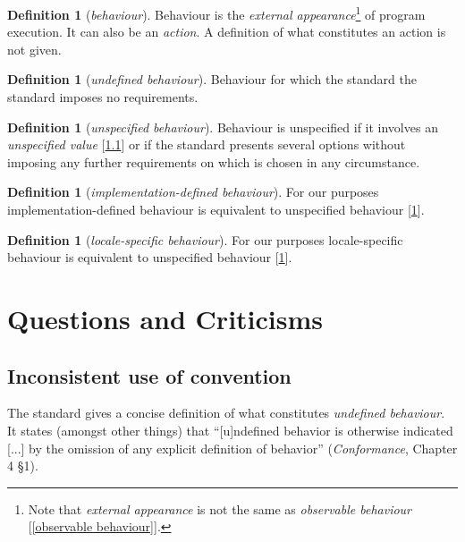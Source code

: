 \documentclass[12pt,a4paper,reqno]{article}
\theoremstyle{plain}
\theoremstyle{definition}
\newtheorem{definition}[subsection]{Definition}
\begin{document}
\begin{definition}[\textit{behaviour}]
Behaviour is the \textit{external appearance}\footnote{Note that \textit{external appearance} is not the same as \textit{observable behaviour} [\ref{observable behaviour}].} of program execution. It can also be an \textit{action}. A definition of what constitutes an action is not given.
\end{definition}

\begin{definition}[\textit{undefined behaviour}]\label{undefined behaviour}
Behaviour for which the standard the standard imposes no requirements.
\end{definition}

\begin{definition}[\textit{unspecified behaviour}]\label{unspecified behaviour}
Behaviour is unspecified if it involves an \textit{unspecified value} [\ref{}] or if the standard presents several options without imposing any further requirements on which is chosen in any circumstance.
\end{definition}

\begin{definition}[\textit{implementation-defined behaviour}]
For our purposes implementation-defined behaviour is equivalent to unspecified behaviour [\ref{unspecified behaviour}].
\end{definition}

\begin{definition}[\textit{locale-specific behaviour}]
For our purposes locale-specific behaviour is equivalent to unspecified behaviour [\ref{unspecified behaviour}].
\end{definition}

\section{Questions and Criticisms}

\subsection{Inconsistent use of convention}
The standard gives a concise definition of what constitutes \textit{undefined behaviour}. It states (amongst other things) that ``[u]ndefined behavior is otherwise indicated [...] by the omission of any explicit definition of behavior'' (\textit{Conformance}, Chapter 4 §1).
\end{document}
